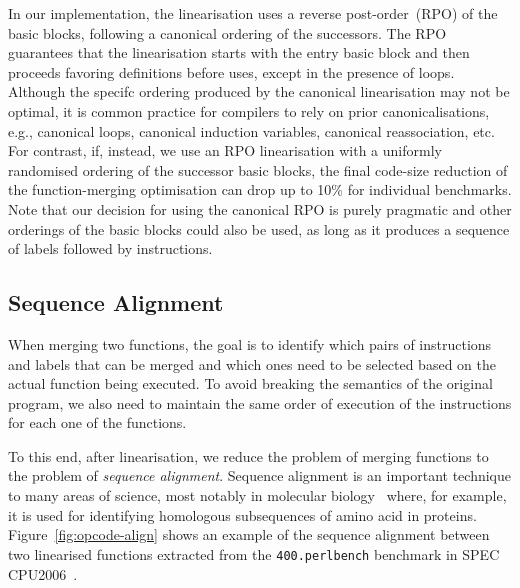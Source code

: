 In our implementation, the linearisation uses a reverse post-order~(RPO) of the
basic blocks, following a canonical ordering of the successors.
The RPO guarantees that the linearisation starts with the entry basic block and
then proceeds favoring definitions before uses, except in the presence of loops.
Although the specifc ordering produced by the canonical linearisation may not
be optimal, it is common practice for compilers to rely on prior
canonicalisations, e.g., 
canonical loops, canonical induction variables, canonical reassociation, etc.
For contrast, if, instead, we use an RPO linearisation with a uniformly
randomised ordering of the successor basic blocks, the final code-size reduction
of the function-merging optimisation can drop up to 10\% for individual
benchmarks.
Note that our decision for using the canonical RPO is purely pragmatic and
other orderings of the basic blocks could also be used, as long as it produces
a sequence of labels followed by instructions.


\subsection{Sequence Alignment}

When merging two functions, the goal is to identify which pairs of instructions
and labels that can be merged and which ones need to be selected based on the
actual function being executed.
To avoid breaking the semantics of the original program, we also need to
maintain the same order of execution of the instructions for each one of
the functions.

To this end, after linearisation, we reduce the problem of merging functions
to the problem of \textit{sequence alignment}. %
Sequence alignment is an important technique to many areas of science,
most notably in molecular biology~\cite{needleman70,smith81,carrillo88,wang94}
where, for example, it is used for identifying homologous subsequences of amino
acid in proteins.
Figure~\ref{fig:opcode-align} shows an example of the sequence alignment
between two linearised functions extracted from the \texttt{400.perlbench} benchmark
in SPEC CPU2006~\cite{spec}.

